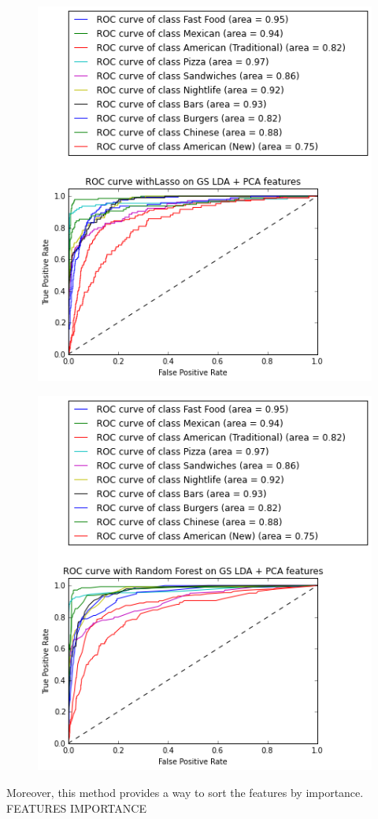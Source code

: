 \documentclass[paper=a4, fontsize=11pt]{scrartcl} %
\numberwithin{equation}{section}
\numberwithin{figure}{section}
\numberwithin{table}{section}
\begin{document}
\begin{figure}[H]
	\includegraphics[scale=0.55]{img/roc_lasso.png}
	\centering
\end{figure}

\begin{figure}[H]
	\includegraphics[scale=0.55]{img/roc_rf.png}
	\centering
\end{figure}

Moreover, this method provides a way to sort the features by importance.\\

FEATURES IMPORTANCE
\end{document}
